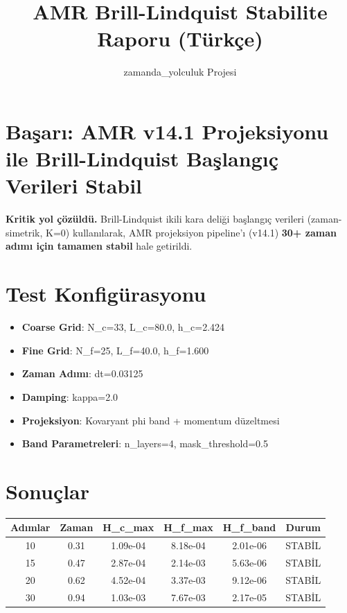 \documentclass[11pt,a4paper]{article}
\title{AMR Brill-Lindquist Stabilite Raporu (Türkçe)}
\author{zamanda\_yolculuk Projesi}
\date{}
\begin{document}
\maketitle

\section*{Başarı: AMR v14.1 Projeksiyonu ile Brill-Lindquist Başlangıç Verileri Stabil}

\textbf{Kritik yol çözüldü.} Brill-Lindquist ikili kara deliği başlangıç verileri (zaman-simetrik, K=0) kullanılarak, AMR projeksiyon pipeline'ı (v14.1) \textbf{30+ zaman adımı için tamamen stabil} hale getirildi.

\section*{Test Konfigürasyonu}
\begin{itemize}
    \item \textbf{Coarse Grid}: N\_c=33, L\_c=80.0, h\_c=2.424
    \item \textbf{Fine Grid}: N\_f=25, L\_f=40.0, h\_f=1.600
    \item \textbf{Zaman Adımı}: dt=0.03125
    \item \textbf{Damping}: kappa=2.0
    \item \textbf{Projeksiyon}: Kovaryant phi band + momentum düzeltmesi
    \item \textbf{Band Parametreleri}: n\_layers=4, mask\_threshold=0.5
\end{itemize}

\section*{Sonuçlar}

\begin{longtable}{cccccc}
\toprule
Adımlar & Zaman & H\_c\_max & H\_f\_max & H\_f\_band & Durum \\
\midrule
10 & 0.31 & 1.09e-04 & 8.18e-04 & 2.01e-06 & STABİL \\
15 & 0.47 & 2.87e-04 & 2.14e-03 & 5.63e-06 & STABİL \\
20 & 0.62 & 4.52e-04 & 3.37e-03 & 9.12e-06 & STABİL \\
30 & 0.94 & 1.03e-03 & 7.67e-03 & 2.17e-05 & STABİL \\
\bottomrule
\end{longtable}
\end{document}

